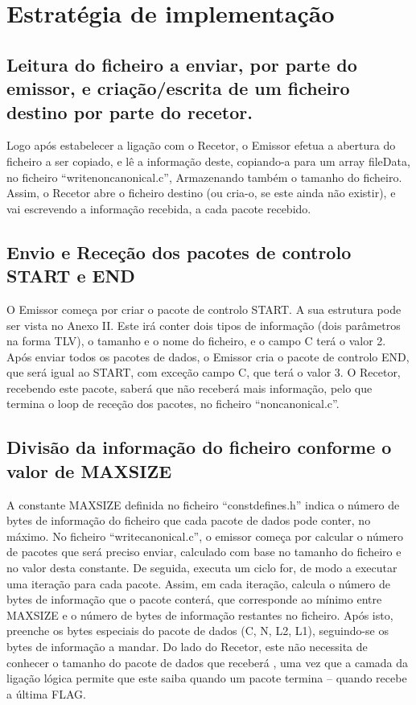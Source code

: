 \documentclass[article, a4paper, 11pt, oneside]{memoir}
\begin{document}
\section{Estratégia de implementação}
\subsection{Leitura do ficheiro a enviar, por parte do emissor, e criação/escrita de um ficheiro destino por parte do recetor.} 

Logo após estabelecer a ligação com o Recetor, o Emissor efetua a abertura do ficheiro a ser copiado, e lê a informação deste,
copiando-a para um array fileData, no ficheiro “writenoncanonical.c”, Armazenando também o 
tamanho do ficheiro. Assim, o Recetor abre o ficheiro destino (ou cria-o, se este ainda não existir), e vai escrevendo a informação recebida, a cada pacote recebido.

\subsection{Envio e Receção dos pacotes de controlo START e END}
O Emissor começa por criar o pacote de controlo START. A sua estrutura pode ser vista no Anexo II. Este irá conter dois tipos de informação (dois parâmetros na forma TLV), 
o tamanho e o nome do ficheiro,
 e o campo C terá o valor 2. 
Após enviar todos os pacotes de dados, o Emissor cria o pacote de controlo END, que será igual ao START, com exceção 
 campo C, que terá o valor 3. 
O Recetor, recebendo este pacote, saberá que não receberá mais informação, pelo que termina o loop de receção dos
 pacotes, no ficheiro “noncanonical.c”.

\subsection{Divisão da informação do ficheiro conforme o valor de MAX\textunderscore SIZE}

A constante MAX\textunderscore SIZE definida no ficheiro “constdefines.h” indica o número de bytes de informação do
ficheiro que cada pacote de dados pode conter, no máximo.
No ficheiro “writecanonical.c”, o emissor começa por calcular o número de pacotes que será preciso enviar, 
calculado com base no tamanho do ficheiro e no valor desta constante. De seguida, executa um ciclo for, de modo 
a executar uma iteração para cada pacote.
Assim, em cada iteração, calcula o número de bytes de informação que o pacote conterá, que corresponde ao 
mínimo entre MAX\textunderscore SIZE e o número de bytes de informação 
restantes no ficheiro. Após isto, preenche os bytes especiais do pacote de dados (C, N, L2, L1), seguindo-se 
os bytes de informação a mandar. Do lado do Recetor, 
este não necessita de conhecer o tamanho do pacote de dados que receberá , uma vez que a camada da ligação 
lógica permite que este saiba quando um pacote termina – quando recebe a última FLAG.
\end{document}

